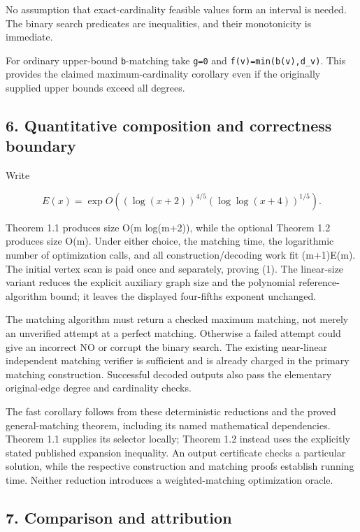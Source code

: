 No assumption that exact-cardinality feasible values form an interval is needed. The binary search predicates are inequalities, and their monotonicity is immediate.

For ordinary upper-bound \texttt{b}-matching take \texttt{g=0} and \texttt{f(v)=min(b(v),d\_v)}. This provides the claimed maximum-cardinality corollary even if the originally supplied upper bounds exceed all degrees.

\hypertarget{af-9f2952a6d0-quantitative-composition-and-correctness-boundary}{%
\subsection{6. Quantitative composition and correctness boundary}\label{af-9f2952a6d0-quantitative-composition-and-correctness-boundary}}

Write

\[
E(x)=\exp O\!\left((\log(x+2))^{4/5}
                    (\log\log(x+4))^{1/5}\right).
\]

Theorem 1.1 produces size O(m log(m+2)), while the optional Theorem 1.2 produces size O(m). Under either choice, the matching time, the logarithmic number of optimization calls, and all construction/decoding work fit (m+1)E(m). The initial vertex scan is paid once and separately, proving (1). The linear-size variant reduces the explicit auxiliary graph size and the polynomial reference-algorithm bound; it leaves the displayed four-fifths exponent unchanged.

The matching algorithm must return a checked maximum matching, not merely an unverified attempt at a perfect matching. Otherwise a failed attempt could give an incorrect NO or corrupt the binary search. The existing near-linear independent matching verifier is sufficient and is already charged in the primary matching construction. Successful decoded outputs also pass the elementary original-edge degree and cardinality checks.

The fast corollary follows from these deterministic reductions and the proved general-matching theorem, including its named mathematical dependencies. Theorem 1.1 supplies its selector locally; Theorem 1.2 instead uses the explicitly stated published expansion inequality. An output certificate checks a particular solution, while the respective construction and matching proofs establish running time. Neither reduction introduces a weighted-matching optimization oracle.

\hypertarget{af-9f2952a6d0-comparison-and-attribution}{%
\subsection{7. Comparison and attribution}\label{af-9f2952a6d0-comparison-and-attribution}}

